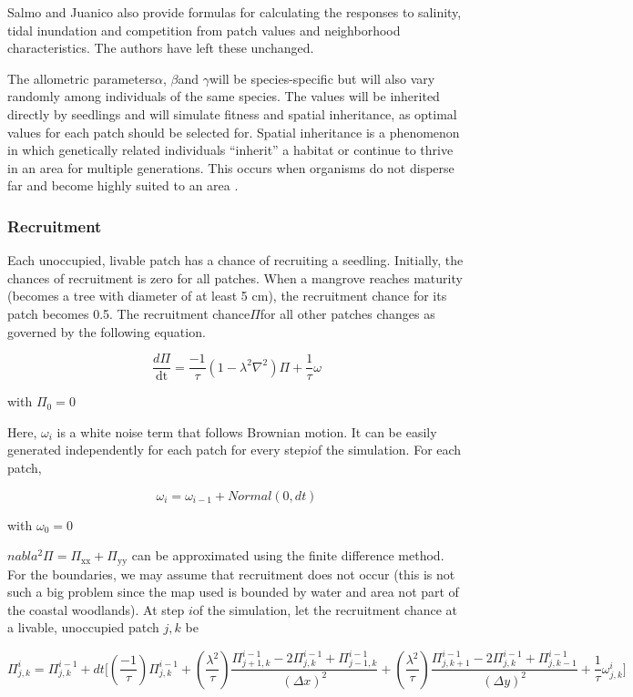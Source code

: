 Salmo and Juanico also provide formulas for calculating the responses to
salinity, tidal inundation and competition from patch values and
neighborhood characteristics. The authors have left these unchanged.

The allometric parameters\(\alpha\), \(\beta\)and \(\gamma\)will be
species-specific but will also vary randomly among individuals of the
same species. The values will be inherited directly by seedlings and
will simulate fitness and spatial inheritance, as optimal values for
each patch should be selected for. Spatial inheritance is a phenomenon
in which genetically related individuals ``inherit'' a habitat or
continue to thrive in an area for multiple generations. This occurs when
organisms do not disperse far and become highly suited to an area \cite{Schauber2007}.

\subsubsection{Recruitment}

Each unoccupied, livable patch has a chance of recruiting a seedling.
Initially, the chances of recruitment is zero for all patches. When a
mangrove reaches maturity (becomes a tree with diameter of at least 5
cm), the recruitment chance for its patch becomes 0.5. The recruitment
chance\(\Pi\)for all other patches changes as governed by the following
equation.

$$\frac{d\Pi}{\text{dt}} = \frac{- 1}{\tau}(1 - \lambda^{2}\nabla^{2})\Pi + \frac{1}{\tau}\omega$$

with $\Pi_{0} = 0$

Here, $\omega_{i}$ is a white noise term that follows Brownian motion.
It can be easily generated independently for each patch for every
step\(i\)of the simulation. For each patch,

$$\omega_{i} = \omega_{i - 1} + Normal(0,dt)$$

with $\omega_{0} = 0$


$nabla^{2}\Pi = \Pi_{\text{xx}} + \Pi_{\text{yy}}$ can be approximated
using the finite difference method. For the boundaries, we may assume
that recruitment does not occur (this is not such a big problem since
the map used is bounded by water and area not part of the coastal
woodlands). At step \(i\)of the simulation, let the recruitment chance
at a livable, unoccupied patch \(j,k\) be

\begin{dmath}
\Pi_{j,k}^{i} = \Pi_{j,k}^{i - 1} + dt\lbrack(\frac{- 1}{\tau})\Pi_{j,k}^{i - 1} + (\frac{\lambda^{2}}{\tau})\frac{\Pi_{j + 1,k}^{i - 1} - 2\Pi_{j,k}^{i - 1} + \Pi_{j - 1,k}^{i - 1}}{{(\Delta x)}^{2}} + (\frac{\lambda^{2}}{\tau})\frac{\Pi_{j,k + 1}^{i - 1} - 2\Pi_{j,k}^{i - 1} + \Pi_{j,k - 1}^{i - 1}}{{(\Delta y)}^{2}} + \frac{1}{\tau}\omega_{j,k}^{i}\rbrack
\end{dmath}

